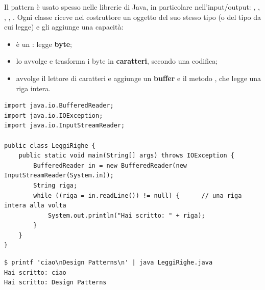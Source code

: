 Il pattern è usato spesso nelle librerie di Java, in particolare nell'input/output: , , , , . Ogni classe
riceve nel costruttore un oggetto del suo stesso tipo (o del tipo da cui legge) e gli aggiunge una capacità:
\begin{itemize}
  \item {} è un : legge \textbf{byte};
  \item {} lo avvolge e trasforma i byte in \textbf{caratteri}, secondo una codifica;
  \item {} avvolge il lettore di caratteri e aggiunge un \textbf{buffer} e il metodo , che
        legge una riga intera.
\end{itemize}

\begin{lstlisting}[style=java, name=LeggiRighe.java]
import java.io.BufferedReader;
import java.io.IOException;
import java.io.InputStreamReader;

public class LeggiRighe {
    public static void main(String[] args) throws IOException {
        BufferedReader in = new BufferedReader(new InputStreamReader(System.in));
        String riga;
        while ((riga = in.readLine()) != null) {      // una riga intera alla volta
            System.out.println("Hai scritto: " + riga);
        }
    }
}
\end{lstlisting}
\noindent\begin{minipage}[c]{0.56\textwidth}
\begin{lstlisting}[style=shell, name=Terminale]
$ printf 'ciao\nDesign Patterns\n' | java LeggiRighe.java
Hai scritto: ciao
Hai scritto: Design Patterns
\end{lstlisting}
\end{minipage}\hfill
\begin{minipage}[c]{0.41\textwidth}
\centering
{}
\end{minipage}

